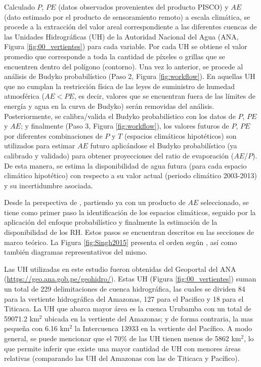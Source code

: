 \documentclass[12pt]{article}
\begin{document}
Calculado $P$, $PE$ (datos observados provenientes del producto PISCO) y $AE$ (dato estimado por el producto de sensoramiento remoto) a escala climática, se procede a la extracción del valor areal correspondiente a las diferentes cuencas de las Unidades Hidrográficas (UH) de la Autoridad Nacional del Agua (ANA, Figura \ref{fig:00_vertientes}) para cada variable. Por cada UH se obtiene el valor promedio que corresponde a toda la cantidad de píxeles o grillas que se encuentren dentro del polígono (contorno). Una vez lo anterior, se procede al análisis de Budyko probabilístico (Paso 2, Figura \ref{fig:workflow}). En aquellas UH que no cumplan la restricción física de las leyes de suministro de humedad atmosférica ($AE < PE$, es decir, valores que se encuentran fuera de las límites de energía y agua en la curva de Budyko) serán removidas del análisis. Posteriormente, se calibra/valida el Budyko probabilístico con los datos de $P$, $PE$  y $AE$; y finalmente (Paso 3, Figura \ref{fig:workflow}), los valores futuros de $P$, $PE$ por diferentes combinaciones de $P$ y $T$ (espacios climáticos hipotéticos) son utilizados para estimar $AE$ futuro aplicándose el Budyko probabilístico (ya calibrado y validado) para obtener proyecciones del ratio de evaporación ($AE$/$P$). De esta manera, se estima la disponibilidad de agua futura (para cada espacio climático hipotético) con respecto a su valor actual (periodo climático 2003-2013) y su incertidumbre asociada.

Desde la perspectiva de \citet{Singh2015}, partiendo ya con un producto de $AE$ seleccionado, se tiene como primer paso la identificación de los espacios climáticos, seguido por la aplicación del enfoque probabilístico y finalmente la estimación de la disponibilidad de los RH. Estos pasos se encuentran descritos en las secciones de marco teórico. La Figura \ref{fig:Singh2015} presenta el orden según \citet{Singh2015}, así como también diagramas representativos del mismo.

Las UH utilizadas en este estudio fueron obtenidas del Geoportal del ANA (\url{https://geo.ana.gob.pe/geohidro/}). Estas UH (Figura \ref{fig:00_vertientes}) suman un total de 229 delimitaciones de cuenca hidrográfica, las cuales se dividen 84 para la vertiente hidrográfica del Amazonas, 127 para el Pacifico y 18 para el Titicaca. La UH que abarca mayor área es la cuenca Urubamba con un total de 59071.2 km$^{2}$ ubicada en la vertiente del Amazonas; y de forma contraria, la mas pequeña con 6.16 km$^{2}$ la Intercuenca 13933 en la vertiente del Pacífico. A modo general, se puede mencionar que el 70\% de las UH tienen menos de 5862 km$^{2}$, lo que permite inferir que existe una mayor cantidad de UH con menores áreas relativas (comparando las UH del Amazonas con las de Titicaca y Pacífico).
\end{document}
